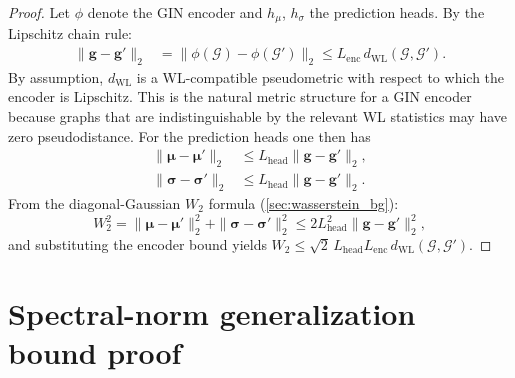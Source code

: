 \documentclass[aps,prx,reprint,superscriptaddress,longbibliography]{revtex4-2}
\newcommand{\GIN}{\textnormal{\textsc{GIN}}}
\newcommand{\calG}{\mathcal{G}}
\begin{document}
\begin{proof}
Let $\phi$ denote the \GIN{} encoder and $h_\mu$, $h_\sigma$ the
prediction heads.  By the Lipschitz chain rule:
\begin{align*}
    \|\bm{g} - \bm{g}'\|_2
    &= \|\phi(\calG) - \phi(\calG')\|_2
    \le L_{\mathrm{enc}}\, d_{\mathrm{WL}}(\calG,\calG').
\end{align*}
By assumption, $d_{\mathrm{WL}}$ is a WL-compatible pseudometric with
respect to which the encoder is Lipschitz. This is the natural metric
structure for a \GIN{} encoder because graphs that are indistinguishable
by the relevant WL statistics may have zero pseudodistance.
For the prediction heads one then has
\begin{align*}
    \|\bm\mu - \bm\mu'\|_2 &\le L_{\mathrm{head}}\|\bm{g} -
    \bm{g}'\|_2, \\
    \|\bm\sigma - \bm\sigma'\|_2 &\le L_{\mathrm{head}}\|\bm{g} -
    \bm{g}'\|_2.
\end{align*}
From the diagonal-Gaussian $W_2$ formula
(\cref{sec:wasserstein_bg}):
\begin{equation*}
    W_2^2 = \|\bm\mu - \bm\mu'\|_2^2 + \|\bm\sigma -
    \bm\sigma'\|_2^2
    \le 2 L_{\mathrm{head}}^2 \|\bm{g} - \bm{g}'\|_2^2,
\end{equation*}
and substituting the encoder bound yields
$W_2 \le \sqrt{2}\, L_{\mathrm{head}} L_{\mathrm{enc}}\,
d_{\mathrm{WL}}(\calG,\calG')$.
\end{proof}

\section{Spectral-norm generalization bound proof}
\label{app:proof_gen}
\end{document}
